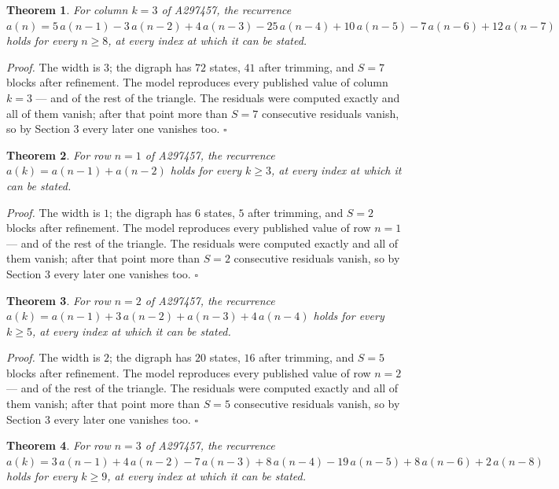 \documentclass[11pt]{article}
\newtheorem{theorem}{Theorem}
\theoremstyle{definition}
\begin{document}
\begin{theorem} For column $k = 3$ of A297457, the recurrence $a(n) = 5\,a(n-1) - 3\,a(n-2) + 4\,a(n-3) - 25\,a(n-4) + 10\,a(n-5) - 7\,a(n-6) + 12\,a(n-7)$ holds for every $n \ge 8$, at every index at which it can be stated.\end{theorem}

{\itshape Proof.} The width is $3$; the digraph has $72$ states, $41$ after trimming, and $S = 7$ blocks after refinement. The model reproduces every published value of column $k = 3$ --- and of the rest of the triangle. The residuals were computed exactly and all of them vanish; after that point more than $S = 7$ consecutive residuals vanish, so by Section 3 every later one vanishes too. $\square$

\begin{theorem} For row $n = 1$ of A297457, the recurrence $a(k) = a(n-1) + a(n-2)$ holds for every $k \ge 3$, at every index at which it can be stated.\end{theorem}

{\itshape Proof.} The width is $1$; the digraph has $6$ states, $5$ after trimming, and $S = 2$ blocks after refinement. The model reproduces every published value of row $n = 1$ --- and of the rest of the triangle. The residuals were computed exactly and all of them vanish; after that point more than $S = 2$ consecutive residuals vanish, so by Section 3 every later one vanishes too. $\square$

\begin{theorem} For row $n = 2$ of A297457, the recurrence $a(k) = a(n-1) + 3\,a(n-2) + a(n-3) + 4\,a(n-4)$ holds for every $k \ge 5$, at every index at which it can be stated.\end{theorem}

{\itshape Proof.} The width is $2$; the digraph has $20$ states, $16$ after trimming, and $S = 5$ blocks after refinement. The model reproduces every published value of row $n = 2$ --- and of the rest of the triangle. The residuals were computed exactly and all of them vanish; after that point more than $S = 5$ consecutive residuals vanish, so by Section 3 every later one vanishes too. $\square$

\begin{theorem} For row $n = 3$ of A297457, the recurrence $a(k) = 3\,a(n-1) + 4\,a(n-2) - 7\,a(n-3) + 8\,a(n-4) - 19\,a(n-5) + 8\,a(n-6) + 2\,a(n-8)$ holds for every $k \ge 9$, at every index at which it can be stated.\end{theorem}
\end{document}
